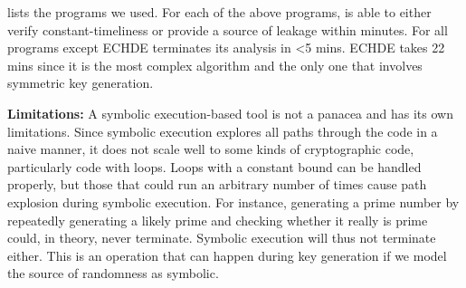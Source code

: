 

 lists the programs we used. For each of the above programs, \kt is able to either verify constant-timeliness or provide a source of leakage within minutes.
For all programs except ECHDE \kt terminates its analysis in <5 mins.
ECHDE takes 22 mins since it is the most complex algorithm and the only one that involves symmetric key generation.  

\textbf{Limitations:} A symbolic execution-based tool is not a panacea and has its own limitations.  
Since symbolic execution explores all paths through the code in a naive manner, it does not scale well to some kinds of cryptographic code, particularly code with loops.
Loops with a constant bound can be handled properly, but those that could run an arbitrary number of times
cause path explosion during symbolic execution.
For instance, generating a prime number by repeatedly generating a likely prime and checking whether
it really is prime could, in theory, never terminate. Symbolic execution will thus not terminate either.
This is an operation that can happen during key generation if we model the source of randomness as symbolic.